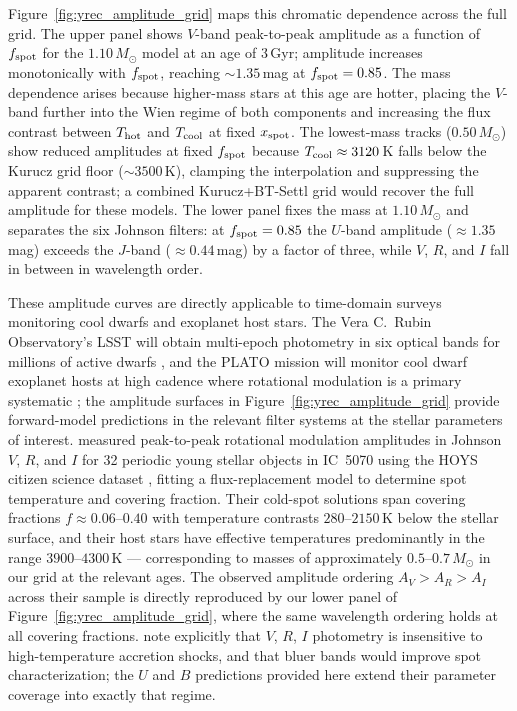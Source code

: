 \documentclass[linenumbers,apj,twocolumn, floatfix]{aastex701}
\begin{document}
Figure~\ref{fig:yrec_amplitude_grid} maps this chromatic dependence across the full grid.
The upper panel shows $V$-band peak-to-peak amplitude as a function of $f_{\rm spot}$ for the $1.10\,M_\odot$ model at an age of 3\,Gyr; amplitude increases monotonically with $f_{\rm spot}$, reaching $\sim 1.35$\,mag at $f_{\rm spot} = 0.85$.
The mass dependence arises because higher-mass stars at this age are hotter, placing the $V$-band further into the Wien regime of both components and increasing the flux contrast between $T_{\rm hot}$ and $T_{\rm cool}$ at fixed $x_{\rm spot}$.
The lowest-mass tracks ($0.50\,M_\odot$) show reduced amplitudes at fixed $f_{\rm spot}$ because $T_{\rm cool} \approx 3120$\,K falls below the Kurucz grid floor ($\sim 3500$\,K), clamping the interpolation and suppressing the apparent contrast; a combined Kurucz+BT-Settl grid would recover the full amplitude for these models.
The lower panel fixes the mass at $1.10\,M_\odot$ and separates the six Johnson filters: at $f_{\rm spot} = 0.85$ the $U$-band amplitude ($\approx 1.35$\,mag) exceeds the $J$-band ($\approx 0.44$\,mag) by a factor of three, while $V$, $R$, and $I$ fall in between in wavelength order.

These amplitude curves are directly applicable to time-domain surveys monitoring cool dwarfs and exoplanet host stars.
The Vera C.\ Rubin Observatory's LSST will obtain multi-epoch photometry in six optical bands for millions of active dwarfs \citep{LSST}, and the PLATO mission will monitor cool dwarf exoplanet hosts at high cadence where rotational modulation is a primary systematic \citep{plato}; the amplitude surfaces in Figure~\ref{fig:yrec_amplitude_grid} provide forward-model predictions in the relevant filter systems at the stellar parameters of interest.
\citet{Herbert2024} measured peak-to-peak rotational modulation amplitudes in Johnson $V$, $R$, and $I$ for 32 periodic young stellar objects in IC~5070 using the HOYS citizen science dataset \citep{Froebrich2018}, fitting a flux-replacement model to determine spot temperature and covering fraction.
Their cold-spot solutions span covering fractions $f \approx 0.06$--$0.40$ with temperature contrasts $280$--$2150$\,K below the stellar surface, and their host stars have effective temperatures predominantly in the range $3900$--$4300$\,K --- corresponding to masses of approximately $0.5$--$0.7\,M_\odot$ in our grid at the relevant ages.
The observed amplitude ordering $A_V > A_R > A_I$ across their sample is directly reproduced by our lower panel of Figure~\ref{fig:yrec_amplitude_grid}, where the same wavelength ordering holds at all covering fractions.
\citet{Herbert2024} note explicitly that $V$, $R$, $I$ photometry is insensitive to high-temperature accretion shocks, and that bluer bands would improve spot characterization; the $U$ and $B$ predictions provided here extend their parameter coverage into exactly that regime.
\end{document}
